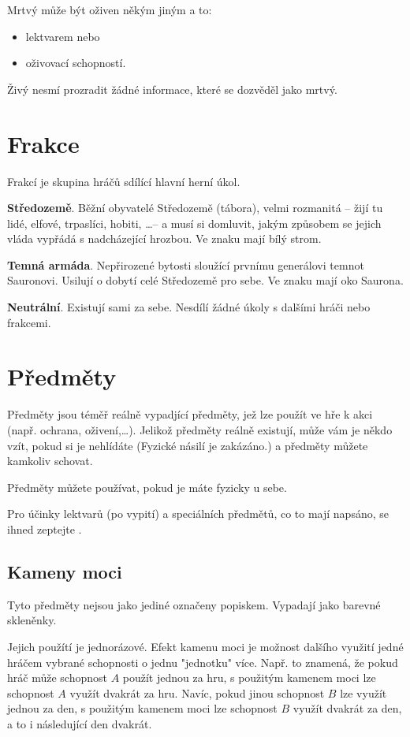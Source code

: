 \documentclass[11pt]{article} %
\newcommand{\albert}{\Nursey[][yellow][blue][red]}
\begin{document}
Mrtvý může být oživen někým jiným a to:
\begin{itemize}
	\item lektvarem nebo
	\item oživovací schopností.
\end{itemize}
Živý nesmí prozradit žádné informace, které se dozvěděl jako mrtvý.

\section{Frakce}
\label{sec:fractions}

Frakcí je skupina hráčů sdílící hlavní herní úkol.

\textbf{Středozemě}.
Běžní obyvatelé Středozemě (tábora), velmi rozmanitá -- žijí tu lidé, elfové, trpaslíci, hobiti, \dots -- a musí si domluvit, jakým způsobem se jejich vláda vypřádá s nadcházející hrozbou.
Ve znaku mají bílý strom.

\textbf{Temná armáda}.
Nepřirozené bytosti sloužící prvnímu generálovi temnot Sauronovi.
Usilují o dobytí celé Středozemě pro sebe.
Ve znaku mají oko Saurona.

\textbf{Neutrální}.
Existují sami za sebe. Nesdílí žádné úkoly s dalšími hráči nebo frakcemi.

\section{Předměty}

Předměty jsou téměř reálně vypadjící předměty, jež lze použít ve hře k akci (např. ochrana, oživení,\dots). Jelikož předměty reálně existují, může vám je někdo vzít, pokud si je nehlídáte (Fyzické násilí je zakázáno.) a předměty můžete kamkoliv schovat.

Předměty můžete používat, pokud je máte fyzicky u sebe.

Pro účinky lektvarů (po vypití) a speciálních předmětů, co to mají napsáno, se ihned zeptejte \albert.

\subsection{Kameny moci}

Tyto předměty nejsou jako jediné označeny popiskem.
Vypadají jako barevné skleněnky.

Jejich použítí je jednorázové.
Efekt kamenu moci je možnost dalšího využití jedné hráčem vybrané schopnosti o jednu "jednotku" více.
Např. to znamená, že pokud hráč může schopnost $A$ použít jednou za hru, s použitým kamenem moci lze schopnost $A$ využít dvakrát za hru.
Navíc, pokud jinou schopnost $B$ lze využít jednou za den, s použitým kamenem moci lze schopnost $B$ využít dvakrát za den, a to i následující den dvakrát.
\end{document}
